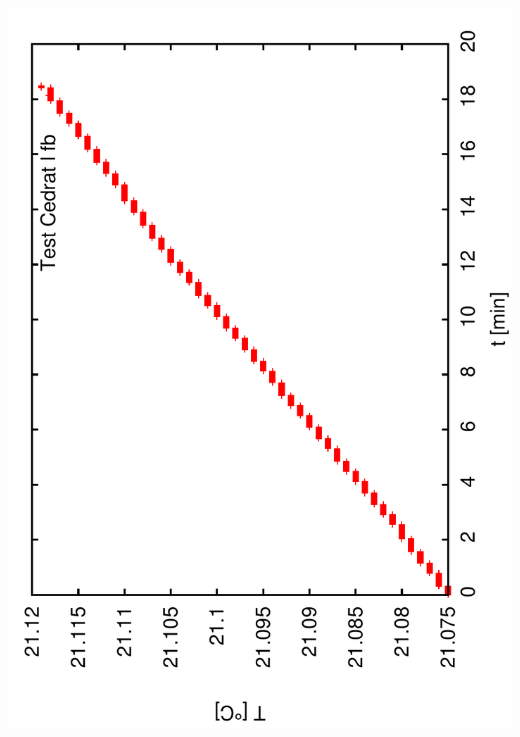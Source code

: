 \documentclass[a4paper,11pt]{book}
\begin{document}
\includegraphics[angle=-90,scale=0.15]{image61a.pdf}\\
\end{document}
